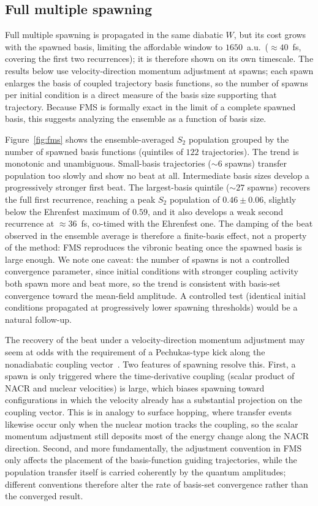 \documentclass[11pt]{article}
\begin{document}
\subsection{Full multiple spawning}
Full multiple spawning is propagated in the same diabatic $W$, but its cost grows with the spawned basis, limiting the affordable window to $1650$~a.u.\ ($\approx\!40$~fs, covering the first two recurrences); it is therefore shown on its own timescale. The results below use velocity-direction momentum adjustment at spawns; each spawn enlarges the basis of coupled trajectory basis functions, so the number of spawns per initial condition is a direct measure of the basis size supporting that trajectory. Because FMS is formally exact in the limit of a complete spawned basis, this suggests analyzing the ensemble as a function of basis size.

Figure~\ref{fig:fms} shows the ensemble-averaged $S_2$ population grouped by the number of spawned basis functions (quintiles of $122$ trajectories). The trend is monotonic and unambiguous. Small-basis trajectories ($\sim\!6$ spawns) transfer population too slowly and show no beat at all. Intermediate basis sizes develop a progressively stronger first beat. The largest-basis quintile ($\sim\!27$ spawns) recovers the full first recurrence, reaching a peak $S_2$ population of $0.46 \pm 0.06$, slightly below the Ehrenfest maximum of $0.59$, and it also develops a weak second recurrence at $\approx\!36$~fs, co-timed with the Ehrenfest one. The damping of the beat observed in the ensemble average is therefore a finite-basis effect, not a property of the method: FMS reproduces the vibronic beating once the spawned basis is large enough. We note one caveat: the number of spawns is not a controlled convergence parameter, since initial conditions with stronger coupling activity both spawn more and beat more, so the trend is consistent with basis-set convergence toward the mean-field amplitude. A controlled test (identical initial conditions propagated at progressively lower spawning thresholds) would be a natural follow-up.

The recovery of the beat under a velocity-direction momentum adjustment may seem at odds with the requirement of a Pechukas-type kick along the nonadiabatic coupling vector~\cite{negrin2023vibrational}. Two features of spawning resolve this. First, a spawn is only triggered where the time-derivative coupling (scalar product of NACR and nuclear velocities) is large, which biases spawning toward configurations in which the velocity already has a substantial projection on the coupling vector. This is in analogy to surface hopping, where transfer events likewise occur only when the nuclear motion tracks the coupling, so the scalar momentum adjustment still deposits most of the energy change along the NACR direction. Second, and more fundamentally, the adjustment convention in FMS only affects the placement of the basis-function guiding trajectories, while the population transfer itself is carried coherently by the quantum amplitudes; different conventions therefore alter the rate of basis-set convergence rather than the converged result.
\end{document}
